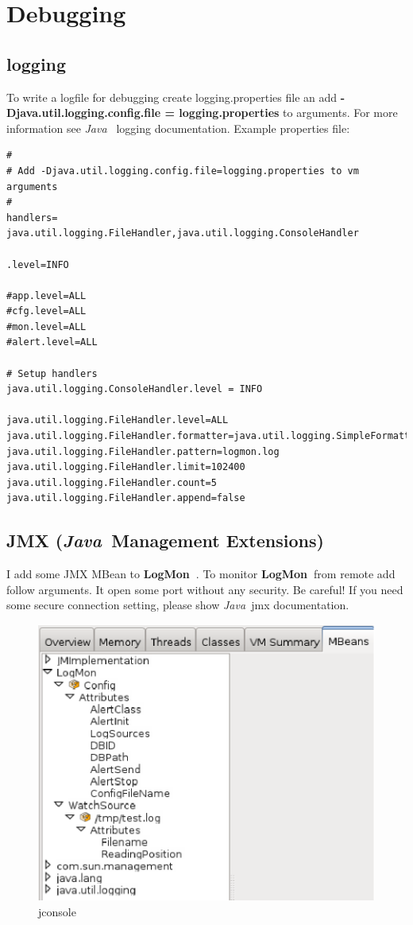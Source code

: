 \documentclass[11pt,a4paper]{article}
\newcommand{\logmon}{\textbf{LogMon\ }}
\newcommand{\java}{\textit{Java\ }}
\begin{document}
\section{Debugging}

\subsection{logging}

To write a logfile for debugging create logging.properties file an add
\textbf{-Djava.util.logging.config.file = logging.properties} to arguments.
For more information see \java
logging documentation. Example properties file:

\begin{verbatim}
#
# Add -Djava.util.logging.config.file=logging.properties to vm arguments
#
handlers= java.util.logging.FileHandler,java.util.logging.ConsoleHandler

.level=INFO

#app.level=ALL
#cfg.level=ALL
#mon.level=ALL
#alert.level=ALL

# Setup handlers
java.util.logging.ConsoleHandler.level = INFO

java.util.logging.FileHandler.level=ALL
java.util.logging.FileHandler.formatter=java.util.logging.SimpleFormatter
java.util.logging.FileHandler.pattern=logmon.log
java.util.logging.FileHandler.limit=102400
java.util.logging.FileHandler.count=5
java.util.logging.FileHandler.append=false

\end{verbatim}

\subsection{JMX (\java Management Extensions)}

I add some JMX MBean to \logmon. To monitor \logmon from remote add follow
arguments. It open some port without any security. Be careful!
If you need some secure connection setting, please show \java jmx documentation.

\begin{figure}[h]
\centering
\includegraphics{img/jconsole.eps}
\caption{jconsole}
\end{figure}
\end{document}
